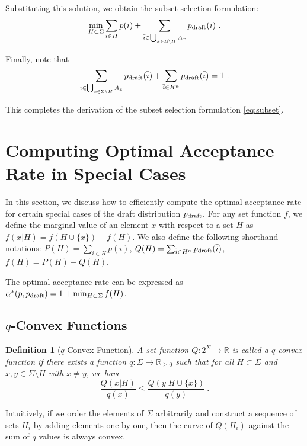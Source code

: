 \documentclass{article}
\makeatletter
\newcommand{\myvspace}{\@ifstar\myvspacestar\myvspacenostar}
\newcommand{\myvspacenostar}[1]{}
\newcommand{\myvspacestar}[1]{}
\newcommand{\crvspace}{\@ifstar\crvspacestar\crvspacenostar}
\newcommand{\crvspacenostar}[1]{}
\newcommand{\crvspacestar}[1]{}
\newtheorem{definition}[theorem]{Definition}
\makeatother
\begin{document}
\par\myvspace{-5pt}
\crvspace{-2pt}
Substituting this solution, we obtain the subset selection formulation:
\myvspace{-3pt}
\begin{equation}
\min_{H\subset\Sigma}
\sum_{i\in H} p(i)+ \sum_{\bar{i}\in\bigcup_{x\in \Sigma\setminus H} A_x} p_{\operatorname{draft}}(\bar{i})
~.
\end{equation}
\par\myvspace{-5pt}
\crvspace{-2pt}
Finally, note that
\myvspace{-5pt}
\crvspace{-2pt}
\begin{equation}
\sum_{\bar{i}\in\bigcup_{x\in \Sigma\setminus H} A_x} p_{\operatorname{draft}}(\bar{i})+\sum_{\bar{i}\in H^n} p_{\operatorname{draft}}(\bar{i})=1
~.
\end{equation}
\par\myvspace{-5pt}
\crvspace{-2pt}
This completes the derivation of the subset selection formulation \eqref{eq:subset}. \crvspace{-5pt}
\section{Computing Optimal Acceptance Rate in Special Cases}\label{se:special_cases}
\crvspace{-5pt}
In this section, we discuss how to efficiently compute the optimal acceptance rate for certain special cases of the draft distribution $p_{\operatorname{draft}}$. For any set function $f$, we define the marginal value of an element $x$ with respect to a set $H$ as $f(x|H)=f(H\cup \{x\})-f(H)$. 
We also define the following shorthand notations: $P(H)=\sum_{i\in H} p(i)$, $Q(H)=\sum_{\bar{i}\in H^n} p_{\operatorname{draft}}(\bar{i})$, $f(H)=P(H)-Q(H)$.

The optimal acceptance rate can be expressed as
$\alpha^\ast(p,p_{\operatorname{draft}})=1+\min_{H\subset\Sigma} f(H)$.

\myvspace{-5pt}
\crvspace{-3pt}
\subsection{\texorpdfstring{$q$}{q}-Convex Functions}
\myvspace{-5pt}
\crvspace{-2pt}
\begin{definition}[$q$-Convex Function]
A set function $Q:2^\Sigma\to\mathbb{R}$ is called a $q$-convex function if there exists a function $q:\Sigma\to\mathbb{R}_{\geq0}$ such that for all $H\subset \Sigma$ and $x,y\in \Sigma\setminus H$ with $x\neq y$, we have
\begin{equation}
\frac{Q(x|H)}{q(x)}\leq\frac{Q(y|H\cup\{x\})}{q(y)}
~.
\end{equation}
\end{definition}
\par\crvspace{-3pt}
Intuitively, if we order the elements of $\Sigma$ arbitrarily and construct a sequence of sets $H_i$ by adding elements one by one, then the curve of $Q(H_i)$ against the sum of $q$ values is always convex.
\end{document}
